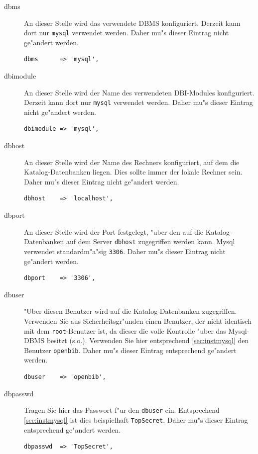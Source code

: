 \documentclass[11pt, twoside, a4paper, BCOR8mm, DIV12, bibtotoc,idxtotoc]{scrbook}
\begin{document}
\begin{description}
\item[dbms] An dieser Stelle wird das verwendete DBMS
  konfiguriert. Derzeit kann dort nur \texttt{mysql} verwendet
  werden. Daher mu"s dieser Eintrag nicht ge"andert werden.
\begin{verbatim}
dbms      => 'mysql',
\end{verbatim}

\item[dbimodule] An dieser Stelle wird der Name des verwendeten
  DBI-Modules konfiguriert. Derzeit kann dort nur \texttt{mysql}
  verwendet werden. Daher mu"s dieser Eintrag nicht ge"andert werden.
\begin{verbatim}
dbimodule => 'mysql',
\end{verbatim}
\item[dbhost] An dieser Stelle wird der Name des Rechners
  konfiguriert, auf dem die Katalog-Datenbanken liegen. Dies sollte
  immer der lokale Rechner sein. Daher mu"s dieser Eintrag nicht
  ge"andert werden.
\begin{verbatim}
dbhost    => 'localhost',
\end{verbatim}
\item[dbport] An dieser Stelle wird der Port festgelegt, "uber den auf
  die Katalog-Datenbanken auf dem Server \texttt{dbhost} zugegriffen
  werden kann. Mysql verwendet standardm"a"sig \texttt{3306}. Daher
  mu"s dieser Eintrag nicht ge"andert werden.
\begin{verbatim}
dbport    => '3306',
\end{verbatim}
\item[dbuser] "Uber diesen Benutzer wird auf die Katalog-Datenbanken
  zugegriffen. Verwenden Sie aus Sicherheitsgr"unden einen Benutzer,
  der nicht identisch mit dem \texttt{root}-Benutzer ist, da dieser
  die volle Kontrolle "uber das Mysql-DBMS besitzt (s.o.). Verwenden
  Sie hier entsprechend \ref{sec:instmysql} den Benutzer
  \texttt{openbib}. Daher mu"s dieser Eintrag entsprechend ge"andert
  werden.
\begin{verbatim}
dbuser    => 'openbib',
\end{verbatim}
\item[dbpasswd] Tragen Sie hier das Passwort f"ur den \texttt{dbuser}
  ein. Entsprechend \ref{sec:instmysql} ist dies beispielhaft
  \texttt{TopSecret}. Daher mu"s dieser Eintrag entsprechend ge"andert
  werden.
\begin{verbatim}
dbpasswd  => 'TopSecret',
\end{verbatim}
\end{description}
\end{document}
